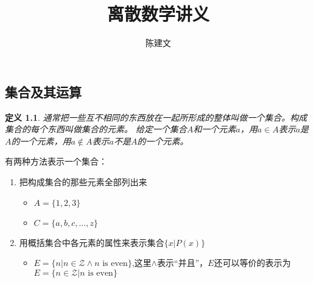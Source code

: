 \documentclass{book}[oneside]
\newtheorem{Def}{定义}[chapter]
\begin{document}
\begin{CJK*}{UTF8}{gbsn}
  \title{离散数学讲义}
  \author{陈建文}
  \maketitle
  






  \setcounter{chapter}{0}
  \chapter{集合及其运算}


  \begin{Def}
    通常把一些互不相同的东西放在一起所形成的整体叫做一个集合。构成集合的每个东西叫做集合的元素。
给定一个集合$A$和一个元素$a$，用$a \in A$表示$a$是$A$的一个元素，用$a \notin A$表示$a$不是$A$的一个元素。
  \end{Def}

  有两种方法表示一个集合：
\begin{enumerate}
\item 把构成集合的那些元素全部列出来
  \begin{itemize}
  \item $A = \{1, 2, 3\}$
\item $C = \{a, b, c, \ldots, z\}$
  \end{itemize}
\item 用概括集合中各元素的属性来表示集合$\{x|P(x)\}$
\begin{itemize}
\item $E = \{n|n \in \mathcal{Z} \land n\text{ is even}\}$,这里$\land$表示“并且”，$E$还可以等价的表示为$E = \{n \in \mathcal{Z} | n\text{ is even}\}$
\end{itemize}
\end{enumerate}


\end{CJK*}
\end{document}
